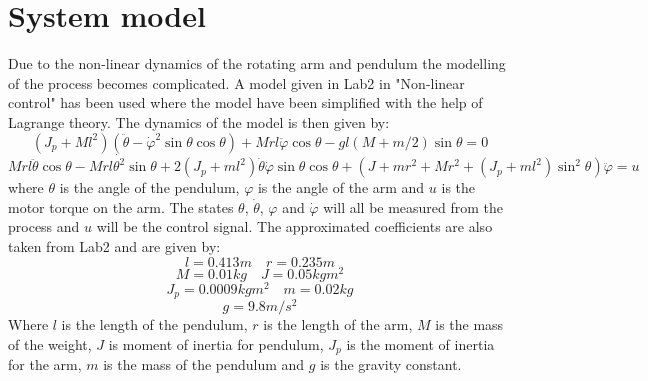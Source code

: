 \documentclass[10pt,a4paper]{article}
\begin{document}
\section{System model}
Due to the non-linear dynamics of the rotating arm and pendulum the modelling of the process becomes complicated. A model given in Lab2 in "Non-linear control" has been used where the model have been simplified with the help of Lagrange theory. The dynamics of the model is then given by:
$$(J_p + Ml^2)(\ddot{\theta} - \dot{\varphi} ^2\sin\theta \cos\theta )+Mrl\ddot{\varphi}\cos\theta-gl(M+m/2)\sin\theta = 0 $$
\begin{equation}
Mrl\ddot{\theta}\cos\theta - Mrl\dot{\theta ^2}\sin\theta + 2(J_p + ml^2 ) \dot{\theta} \dot{\varphi}\sin\theta \cos\theta + (J+mr^2 + Mr^2 + (J_p+ml^2)\sin^2\theta)\ddot{\varphi}=u
\label{eq:model}
\end{equation}
where $\theta$ is the angle of the pendulum, $\varphi$ is the angle of the arm and $u$ is the motor torque on the arm. The states $\theta$, $\dot{\theta}$, $\varphi$ and $\dot{\varphi}$ will all be measured from the process and $u$ will be the control signal. The approximated coefficients are also taken from Lab2 and are given by:
$$l=0.413m \quad  r=0.235m$$
$$M=0.01kg \quad J=0.05kgm^2$$
$$J_p=0.0009kgm^2 \quad m=0.02kg$$
$$ g=9.8m/s^2$$
Where $l$ is the length of the pendulum, $r$ is the length of the arm, $M$ is the mass of the weight, $J$ is moment of inertia  for pendulum, $J_p$ is the moment of inertia for the arm, $m$ is the mass of the pendulum and $g$ is the gravity constant.
\end{document}
